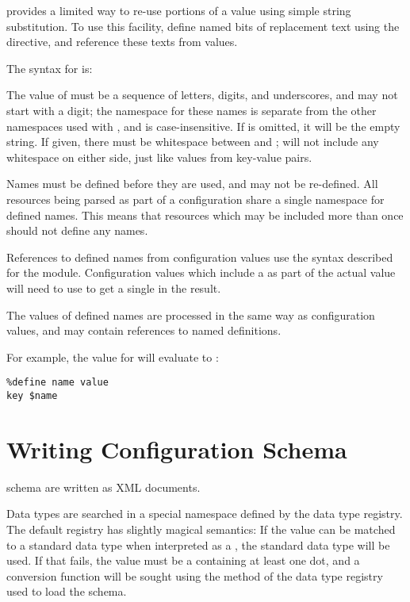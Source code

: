 \documentclass{howto}
\newcommand{\datatype}[1]{\strong{#1}}
\begin{document}
 provides a limited way to re-use portions of a value
using simple string substitution.  To use this facility, define named
bits of replacement text using the  directive, and
reference these texts from values.

The syntax for  is:

\begin{alltt}
%define \var{name} \optional{\var{value}}
\end{alltt}

The value of  must be a sequence of letters, digits, and
underscores, and may not start with a digit; the namespace for these
names is separate from the other namespaces used with
, and is case-insensitive.  If  is
omitted, it will be the empty string.  If given, there must be
whitespace between  and ;  will not
include any whitespace on either side, just like values from key-value
pairs.

Names must be defined before they are used, and may not be
re-defined.  All resources being parsed as part of a configuration
share a single namespace for defined names.  This means that resources
which may be included more than once should not define any names.

References to defined names from configuration values use the syntax
described for the  module.
Configuration values which include a \character{\$} as part of the
actual value will need to use \code{\$\$} to get a single
\character{\$} in the result.

The values of defined names are processed in the same way as
configuration values, and may contain references to named
definitions.

For example, the value for  will evaluate to :

\begin{verbatim}
%define name value
key $name
\end{verbatim} %


\section{Writing Configuration Schema \label{writing-schema}}

 schema are written as XML documents.

Data types are searched in a special namespace defined by the data
type registry.  The default registry has slightly magical semantics:
If the value can be matched to a standard data type when interpreted
as a \datatype{basic-key}, the standard data type will be used.  If
that fails, the value must be a \datatype{dotted-name} containing at
least one dot, and a conversion function will be sought using the
 method of the data type registry used to load the
schema.
\end{document}
